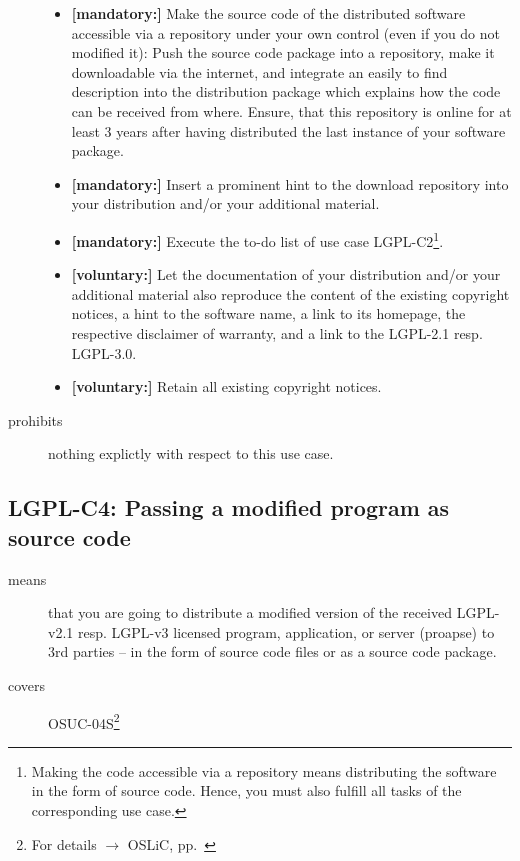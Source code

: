 \begin{description}
\begin{itemize}
  \item \textbf{[mandatory:]} Make the source code of the distributed software
  accessible via a repository under your own control (even if you do not
  modified it): Push the source code package into a repository, make it
  downloadable via the internet, and integrate an easily to find description
  into the distribution package which explains how the code can be received from
  where. Ensure, that this repository is online for at least 3 years after
  having distributed the last instance of your software package.
  
  \item \textbf{[mandatory:]} Insert a prominent hint to the download repository
  into your distribution and/or your additional material.
  
  \item \textbf{[mandatory:]} Execute the to-do list of use case LGPL-C2\footnote{
  Making the code accessible via a repository means distributing the software in
  the form of source code. Hence, you must also fulfill all tasks of the
  corresponding use case.}.
   
  \item \textbf{[voluntary:]} Let the documentation of your distribution and/or
  your additional material also reproduce the content of the existing
  copyright notices, a hint to the software name, a link to its homepage,
  the respective disclaimer of warranty, and a link to the LGPL-2.1 resp.
  LGPL-3.0.
  
  \item \textbf{[voluntary:]} Retain all existing copyright notices.

\end{itemize}

\item[prohibits] nothing explictly with respect to this use case.

\end{description}

\subsection{LGPL-C4: Passing a modified program as source code}
\label{OSUC-04S-LGPL} 

\begin{description}
\item[means] that you are going to distribute a modified version of the received
LGPL-v2.1 resp. LGPL-v3 licensed program, application, or server (proapse) to
3rd parties -- in the form of source code files or as a source code package.
\item[covers] OSUC-04S\footnote{For details $\rightarrow$ OSLiC, pp.\
\pageref{OSUC-04S-DEF}}
\end{description}

